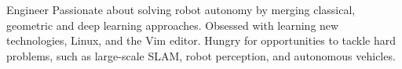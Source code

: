 

\begin{cvparagraph}

Engineer Passionate about solving robot autonomy by merging classical, geometric and deep learning approaches. Obsessed with learning new technologies, Linux, and the Vim editor. Hungry for opportunities to tackle hard problems, such as large-scale SLAM, robot perception, and autonomous vehicles.
\end{cvparagraph}
